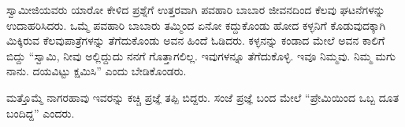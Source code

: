 ಸ್ವಾಮೀಜಿಯವರು ಯಾರೋ ಕೇಳಿದ ಪ್ರಶ್ನೆಗೆ ಉತ್ತರವಾಗಿ ಪವಹಾರಿ ಬಾಬಾರ ಜೀವನದಿಂದ ಕೆಲವು ಘಟನೆಗಳನ್ನು ಉದಾಹರಿಸಿದರು. ಒಮ್ಮೆ ಪವಹಾರಿ ಬಾಬಾರು ತಮ್ಮಿಂದ ಏನೋ ಕದ್ದುಕೊಂಡು ಹೋದ ಕಳ್ಳನಿಗೆ ಕೊಡುವುದಕ್ಕಾಗಿ ಮಿಕ್ಕಿರುವ ಕೆಲವು\break ಪಾತ್ರೆಗಳನ್ನು ತೆಗೆದುಕೊಂಡು ಅವನ ಹಿಂದೆ ಓಡಿದರು. ಕಳ್ಳನನ್ನು ಕಂಡಾದ ಮೇಲೆ ಅವನ ಕಾಲಿಗೆ ಬಿದ್ದು “ಸ್ವಾಮಿ, ನೀವು ಅಲ್ಲಿದ್ದುದು ನನಗೆ ಗೊತ್ತಾಗಲಿಲ್ಲ. ಇವುಗಳನ್ನೂ ತೆಗೆದುಕೊಳ್ಳಿ. ಇವೂ ನಿಮ್ಮವು. ನಿಮ್ಮ ಮಗು ನಾನು. ದಯವಿಟ್ಟು ಕ್ಷಮಿಸಿ” ಎಂದು ಬೇಡಿಕೊಂಡರು.

ಮತ್ತೊಮ್ಮೆ ನಾಗರಹಾವು ಇವರನ್ನು ಕಚ್ಚಿ ಪ್ರಜ್ಞೆ ತಪ್ಪಿ ಬಿದ್ದರು. ಸಂಜೆ ಪ್ರಜ್ಞೆ ಬಂದ ಮೇಲೆ “ಪ್ರೇಮಿಯಿಂದ ಒಬ್ಬ ದೂತ ಬಂದಿದ್ದ” ಎಂದರು.

